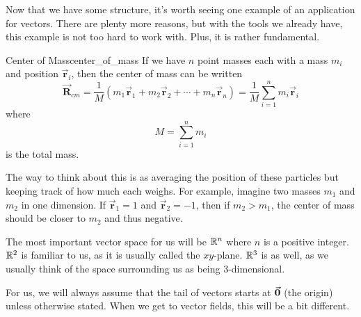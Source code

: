         Now that we have some structure, it's worth seeing one example of an application for vectors. There are plenty more reasons, but with the tools we already have, this example is not too hard to work with. Plus, it is rather fundamental.
        
        \begin{ex}{Center of Mass}{center_of_mass}
        If we have $n$ point masses each with a mass $m_i$ and position $\boldsymbol{\vec{r}}_i$, then the center of mass can be written
        \[
        \boldsymbol{\vec{R}}_{cm}=\frac{1}{M}(m_1\boldsymbol{\vec{r}}_1+m_2 \boldsymbol{\vec{r}}_2 + \cdots + m_n \boldsymbol{\vec{r}}_n)=\frac{1}{M}\sum_{i=1}^n m_i \boldsymbol{\vec{r}}_i
        \]
        where
        \[
        M=\sum_{i=1}^n m_i
        \]
        is the total mass.
        
        The way to think about this is as averaging the position of these particles but keeping track of how much each weighs.  For example, imagine two masses $m_1$ and $m_2$ in one dimension.  If $\boldsymbol{\vec{r}}_1=1$ and $\boldsymbol{\vec{r}}_2=-1$, then if $m_2>m_1$, the center of mass should be closer to $m_2$ and thus negative.
        \end{ex}
        

        
        The most important vector space for us will be $\mathbb{R}^n$ where $n$ is a positive integer.  $\mathbb{R}^2$ is familiar to us, as it is usually called the $xy$-plane. $\mathbb{R}^3$ is as well, as we usually think of the space surrounding us as being 3-dimensional.
        
        \begin{remark}
        For us, we will always assume that the tail of vectors starts at $\boldsymbol{\vec{0}}$ (the origin) unless otherwise stated.  When we get to vector fields, this will be a bit different.
        \end{remark}
        
